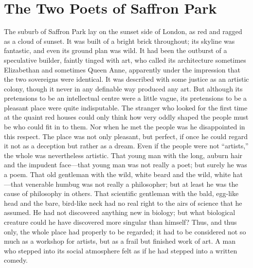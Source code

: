 \documentclass{book}
\begin{document}
\chapter{The Two Poets of Saffron Park}
\label{chapter-0}
The suburb of Saffron Park lay on the sunset side of London, as red and ragged as a cloud of sunset. It was built of a bright brick throughout; its skyline was fantastic, and even its ground plan was wild. It had been the outburst of a speculative builder, faintly tinged with art, who called its architecture sometimes Elizabethan and sometimes Queen Anne, apparently under the impression that the two sovereigns were identical. It was described with some justice as an artistic colony, though it never in any definable way produced any art. But although its pretensions to be an intellectual centre were a little vague, its pretensions to be a pleasant place were quite indisputable. The stranger who looked for the first time at the quaint red houses could only think how very oddly shaped the people must be who could fit in to them. Nor when he met the people was he disappointed in this respect. The place was not only pleasant, but perfect, if once he could regard it not as a deception but rather as a dream. Even if the people were not “artists,” the whole was nevertheless artistic. That young man with the long, auburn hair and the impudent face—that young man was not really a poet; but surely he was a poem. That old gentleman with the wild, white beard and the wild, white hat—that venerable humbug was not really a philosopher; but at least he was the cause of philosophy in others. That scientific gentleman with the bald, egg-like head and the bare, bird-like neck had no real right to the airs of science that he assumed. He had not discovered anything new in biology; but what biological creature could he have discovered more singular than himself? Thus, and thus only, the whole place had properly to be regarded; it had to be considered not so much as a workshop for artists, but as a frail but finished work of art. A man who stepped into its social atmosphere felt as if he had stepped into a written comedy.
\end{document}
